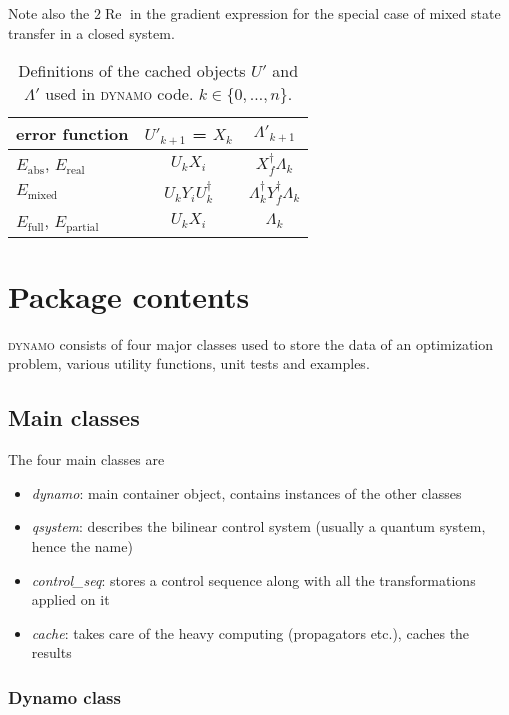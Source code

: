 \documentclass[aps, pra, a4paper, longbibliography, superscriptaddress]{revtex4-1}
\DeclareMathOperator{\re}{Re}
\newcommand{\DYNAMO}{\textsc{dynamo}}
\begin{document}
Note also the $2 \re$ in the gradient expression  
for the special case of mixed state transfer in a closed system.



\begin{table}
\begin{tabular}{l|c|c}
error function & $U'_{k+1}$ = $X_k$ & $\Lambda'_{k+1}$\\
\hline
$E_\text{abs}$, $E_\text{real}$ & $U_k X_i$ & $X_f^\dagger \Lambda_k$\\
$E_\text{mixed}$ & $U_k Y_i U_k^\dagger$ & $\Lambda_k^\dagger Y_f^\dagger \Lambda_k$\\
$E_\text{full}$, $E_\text{partial}$ & $U_k X_i$ & $\Lambda_k$
\end{tabular}
\caption{Definitions of the cached objects $U'$ and $\Lambda'$ used in \DYNAMO{}
  code. $k \in \{0, \ldots, n\}$.}
\label{table:UL}
\end{table}





\section{Package contents}

\DYNAMO{} consists of four major classes used to store the data of an
optimization problem, various utility functions, unit tests and examples.

\subsection{Main classes}

The four main classes are 
\begin{itemize}
\item
\emph{dynamo}: main container object, contains instances of the other classes

\item
\emph{qsystem}: describes the bilinear control system (usually a quantum system, hence the name)

\item
\emph{control\_seq}: stores a control sequence along with all the transformations applied on it

\item
\emph{cache}: takes care of the heavy computing (propagators etc.), caches the results
\end{itemize}

\subsubsection{Dynamo class}
\end{document}

